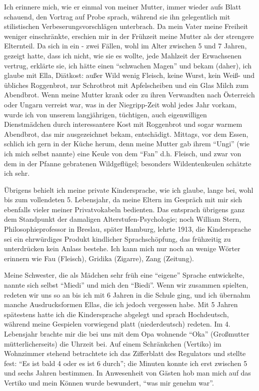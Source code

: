 Ich erinnere mich, wie er einmal von meiner Mutter, immer wieder aufs Blatt schauend, den Vortrag auf Probe sprach, während sie ihn gelegentlich mit stilistischen Verbeserungsvorschlägen unterbrach. Da mein Vater meine Freiheit weniger einschränkte, erschien mir in der Frühzeit meine Mutter als der strengere Elternteil. Da sich in ein - zwei Fällen, wohl im Alter zwischen 5 und 7 Jahren, gezeigt hatte, dass ich nicht, wie sie es wollte, jede Mahlzeit der Erwachsenen vertrug, erklärte sie, ich hätte einen \enquote{schwachen Magen} und bekam (daher), ich glaube mit Ella, Diätkost: außer Wild wenig Fleisch, keine Wurst, kein Weiß- und übliches Roggenbrot, nur Schrotbrot mit Apfelscheiben und ein Glas Milch zum Abendbrot. Wenn meine Mutter krank oder zu ihren Verwandten nach Österreich oder Ungarn verreist war, was in der Niegripp-Zeit wohl jedes Jahr vorkam, wurde ich von unserem langjährigen, tüchtigen, auch eigenwilligen Dienstmädchen durch interessantere Kost mit Roggenbrot und sogar warmem Abendbrot, das mir ausgezeichnet bekam, entschädigt. Mittags, vor dem Essen, schlich ich gern in der Küche herum, denn meine Mutter gab ihrem \enquote{Ungi} (wie ich mich selbst nannte) eine Keule von dem \enquote{Fan} d.h. Fleisch, und zwar von dem in der Pfanne gebratenen Wildgeflügel; besonders Wildentenkeulen schätzte ich sehr.

Übrigens behielt ich meine private Kindersprache, wie ich glaube, lange bei, wohl bis zum vollendeten 5. Lebensjahr, da meine Eltern im Gespräch mit mir sich ebenfalls vieler meiner Privatvokabeln bedienten. Das entsprach übrigens ganz dem Standpunkt der damaligen Alterstufen-Psychologie; noch William Stern, Philosophieprofessor in Breslau, später Hamburg, lehrte 1913, die Kindersprache sei ein ehrwürdiges Produkt kindlicher Sprachschöpfung, das frühzeitig zu unterdrücken kein Anlass bestehe. Ich kann mich nur noch an wenige Wörter erinnern wie Fau (Fleisch), Gridika (Zigarre), Zang (Zeitung).

Meine Schwester, die als Mädchen sehr früh eine \enquote{eigene} Sprache entwickelte, nannte sich selbst \enquote{Miedi} und mich den \enquote{Biedi}. Wenn wir zusammen spielten, redeten wir uns so an bis ich mit 6 Jahren in die Schule ging, und ich übernahm manche Ausdrucksformen Ellas, die ich jedoch vergessen habe. Mit 5 Jahren spätestens hatte ich die Kindersprache abgelegt und sprach Hochdeutsch, während meine Gespielen vorwiegend platt (niederdeutsch) redeten. Im 4. Lebensjahr brachte mir die bei uns mit dem Opa wohnende \enquote{Oka} (Großmutter mütterlicherseits) die Uhrzeit bei. Auf einem Schränkchen (Vertiko) im Wohnzimmer stehend betrachtete ich das Zifferblatt des Regulators und stellte fest: \enquote{Es ist bald 4 oder es ist 6 durch}; die Minuten konnte ich erst zwischen 5 und sechs Jahren bestimmen. In Anwesenheit von Gästen hob man mich auf das Vertiko und mein Können wurde bewundert, \enquote{was mir genehm war}.

